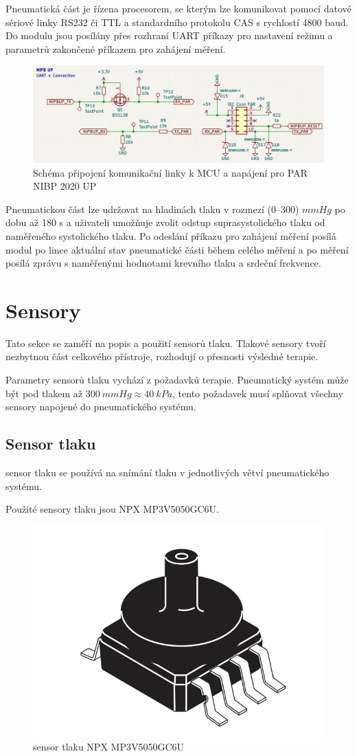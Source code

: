 Pneumatická část je řízena procesorem, se kterým lze komunikovat pomocí datové sériové linky RS232 či TTL a standardního protokolu CAS s rychlostí 4800 baud. Do modulu jsou posílány přes rozhraní UART příkazy pro nastavení režimu a parametrů zakončené příkazem pro zahájení měření.
\begin{figure}[H]
    \centering
    \includegraphics[width=0.9\linewidth]{pictures/nibpup_connection.jpg}
    \caption{Schéma připojení komunikační linky k MCU a napájení pro PAR NIBP 2020 UP }
    \label{fig:par_modul_comm}
\end{figure}
Pneumatickou část lze udržovat na hladinách tlaku v rozmezí (0–300) $mmHg$ po dobu až 180 s a uživateli umožňuje zvolit odstup suprasystolického tlaku od naměřeného systolického tlaku. Po odeslání příkazu pro zahájení měření posílá modul po lince aktuální stav pneumatické části během celého měření a po měření posílá zprávu s naměřenými hodnotami krevního tlaku a srdeční frekvence.
\section{Sensory}
Tato sekce se zaměří na popis a použití sensorů tlaku. Tlakové sensory tvoří nezbytnou část celkového přístroje, rozhodují o přesnosti výsledné terapie. \par
Parametry sensorů tlaku vychází z požadavků terapie. Pneumatický systém může být pod tlakem až $300 \ mmHg \approx 40 \ kPa$, tento požadavek musí splňovat všechny sensory napojené do pneumatického systému.

\subsection{Sensor tlaku} \label{section:pressure_sen}
sensor tlaku se používá na snímání tlaku v jednotlivých větví pneumatického systému. \par

Použité sensory tlaku jsou NPX MP3V5050GC6U.

\begin{figure}[H]
    \centering
    \includegraphics[width=0.5\linewidth]{pictures/nxp_sensor.jpg}
    \caption{sensor tlaku NPX MP3V5050GC6U \cite{cite:NXP}}
    \label{fig:nxp}
\end{figure}

